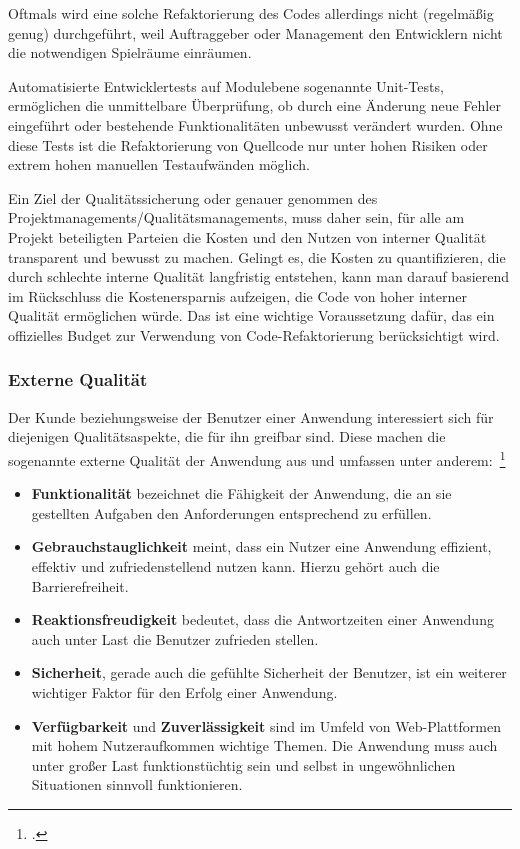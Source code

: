 Oftmals wird eine solche Refaktorierung des Codes allerdings nicht (regelmäßig genug) durchgeführt, weil Auftraggeber oder Management den Entwicklern nicht die notwendigen Spielräume einräumen.

Automatisierte Entwicklertests auf Modulebene sogenannte Unit-Tests, ermöglichen die unmittelbare Überprüfung, ob durch eine Änderung neue Fehler eingeführt oder bestehende Funktionalitäten unbewusst verändert wurden. Ohne diese Tests ist die Refaktorierung von Quellcode nur unter hohen Risiken oder extrem hohen manuellen Testaufwänden möglich.

Ein Ziel der Qualitätssicherung oder genauer genommen des Projektmanagements/Qualitätsmanagements, muss daher sein, für alle am Projekt beteiligten Parteien die Kosten und den Nutzen von interner Qualität transparent und bewusst zu machen. Gelingt es, die Kosten zu quantifizieren, die durch schlechte interne Qualität langfristig entstehen, kann man darauf basierend im Rückschluss die Kostenersparnis aufzeigen, die Code von hoher interner Qualität ermöglichen würde. Das ist eine wichtige Voraussetzung dafür, das ein offizielles Budget zur Verwendung von Code-Refaktorierung berücksichtigt wird.

\subsubsection{Externe Qualität}
Der Kunde beziehungsweise der Benutzer einer Anwendung interessiert sich für diejenigen Qualitätsaspekte, die für ihn greifbar sind. Diese machen die sogenannte externe Qualität
der Anwendung aus und umfassen unter anderem:~\footcite[Vgl. Seite 5]{Bergmann.2013}
\begin{itemize}
    \item \textbf{Funktionalität} bezeichnet die Fähigkeit der Anwendung, die an sie gestellten Aufgaben den Anforderungen entsprechend zu erfüllen.
    
    \item \textbf{Gebrauchstauglichkeit} meint, dass ein Nutzer eine Anwendung effizient, effektiv und zufriedenstellend nutzen kann. Hierzu gehört auch die Barrierefreiheit.

    \item \textbf{Reaktionsfreudigkeit} bedeutet, dass die Antwortzeiten einer Anwendung auch unter Last die Benutzer zufrieden stellen. 

    \item \textbf{Sicherheit}, gerade auch die gefühlte Sicherheit der Benutzer, ist ein weiterer wichtiger Faktor für den Erfolg einer Anwendung.

    \item \textbf{Verfügbarkeit} und \textbf{Zuverlässigkeit} sind im Umfeld von Web-Plattformen mit hohem Nutzeraufkommen wichtige Themen. Die Anwendung muss auch unter großer Last funktionstüchtig sein und selbst in ungewöhnlichen Situationen sinnvoll funktionieren.
\end{itemize}

